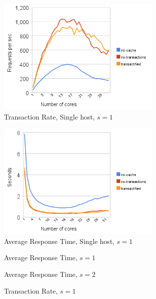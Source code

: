 \documentclass[preprint,natbib,11pt]{sigplanconf}
\begin{document}
\begin{figure}
 \begin{center}
  \includegraphics[width=8cm]{transaction-rate-single-host-1.png}
 \end{center}
 \caption{Transaction Rate, Single host, $s = 1$}
 \label{fig:transaction-rate-single-host-1}
\end{figure}
\begin{figure}
 \begin{center}
  \includegraphics[width=8cm]{response-time-single-host-1.png}
 \end{center}
 \caption{Average Response Time, Single host, $s = 1$}
 \label{fig:response-time-single-host-1}
\end{figure}
\begin{figure}
 \begin{center}
 \end{center}
 \caption{Average Response Time, $s = 1$}
 \label{fig:response-time-1}
\end{figure}
\begin{figure}
 \begin{center}
 \end{center}
 \caption{Average Response Time, $s = 2$}
 \label{fig:response-time-2}
\end{figure}
\begin{figure}
 \begin{center}
 \end{center}
 \caption{Transaction Rate, $s = 1$}
 \label{fig:transaction-rate-1}
\end{figure}
\end{document}
